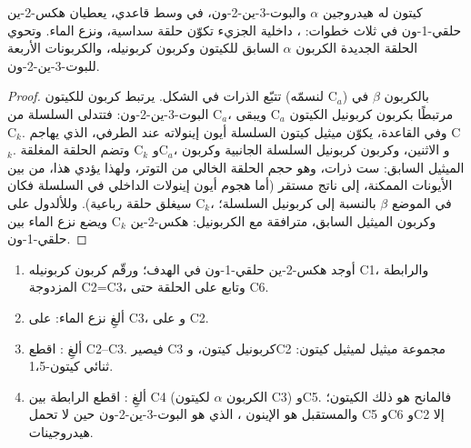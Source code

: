 \begin{proposition}\label{prop:b2:conjugate-additions:robinson}
كيتون له هيدروجين $\alpha$ والبوت-3-ين-2-ون، في وسط قاعدي، يعطيان هكس-2-ين حلقي-1-ون في ثلاث
خطوات: ،  داخلية الجزيء تكوّن حلقة سداسية، ونزع الماء.
وتحوي الحلقة الجديدة الكربون $\alpha$ السابق للكيتون وكربون كربونيله، والكربونات الأربعة
للبوت-3-ين-2-ون.
\end{proposition}

\begin{proof}
تتبّع الذرات في الشكل. يرتبط كربون  للكيتون (لنسمّه C$_a$) بالكربون $\beta$
في البوت-3-ين-2-ون: فتتدلى السلسلة  من C$_a$، 
ويبقى C$_a$ مرتبطًا بكربون كربونيل الكيتون C$_k$. وفي القاعدة، يكوّن ميثيل كيتون السلسلة
أيون إينولاته عند  الطرفي، الذي يهاجم C$_k$. وتضم الحلقة المغلقة C$_k$ وC$_a$،
و الاثنين، وكربون كربونيل السلسلة الجانبية وكربون الميثيل السابق: ست ذرات، وهو حجم
الحلقة الخالي من التوتر، ولهذا يؤدي  هذا، من بين الأيونات الممكنة، إلى ناتج مستقر (أما
هجوم أيون إينولات  الداخلي في السلسلة فكان سيغلق حلقة رباعية). وللألدول
 على C$_k$، في الموضع $\beta$ بالنسبة إلى كربونيل السلسلة؛ ويضع نزع الماء  بين C$_k$ 
وكربون الميثيل السابق، مترافقة مع الكربونيل: هكس-2-ين حلقي-1-ون.
\end{proof}

\begin{method}\label{met:b2:conjugate-additions:robinson-disconnection}
\begin{enumerate}
  \item أوجد هكس-2-ين حلقي-1-ون في الهدف؛ ورقّم كربون كربونيله C1، والرابطة المزدوجة
        C2=C3، وتابع على الحلقة حتى C6.
  \item ألغِ نزع الماء:  على C3، و على C2.
  \item ألغِ : اقطع C2--C3. فيصير C3 كربونيل كيتون، وC2 مجموعة ميثيل لميثيل
        كيتون: ثنائي كيتون-1،5.
  \item ألغِ : اقطع الرابطة بين C4 (الكربون $\alpha$ لكيتون C3) 
        وC5. فالمانح هو ذلك الكيتون؛ والمستقبل هو الإينون ، الذي هو
        البوت-3-ين-2-ون حين لا تحمل C5 وC6 وC2 إلا هيدروجينات.
\end{enumerate}
\end{method}

